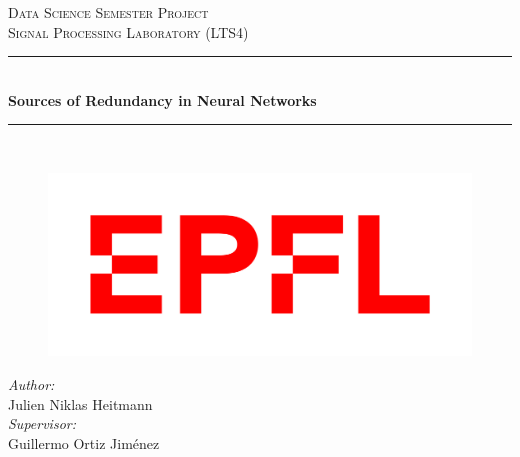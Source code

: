 \begin{titlepage}

\newcommand{\HRule}{\rule{\linewidth}{0.5mm}} %

\center %
 

\textsc{\LARGE Data Science Semester Project}\\[1.5cm] %
\textsc{Signal Processing Laboratory (LTS4)}\\[0.5cm] %



\HRule \\[0.6cm]
{ \huge \bfseries Sources of Redundancy in Neural Networks}\\[0.5cm] %
\HRule \\[1.5cm]


\begin{figure}[!h] 
        \centering \includegraphics[width=0.6\columnwidth]{images/EPFL_Logo_Digital_RGB_PROD.jpg}
\end{figure}

\vspace{2.5cm}


\Large \emph{Author:}\\
Julien Niklas Heitmann\\[.5cm] %
\Large \emph{Supervisor:}\\
Guillermo Ortiz Jiménez\\[.5cm] %

\vfill %
\end{titlepage}
\tableofcontents
\newpage
\justify

